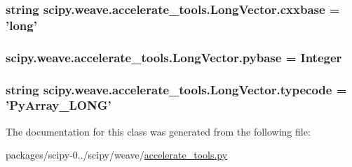 \subsubsection[{cxxbase}]{\setlength{\rightskip}{0pt plus 5cm}string scipy.\+weave.\+accelerate\+\_\+tools.\+Long\+Vector.\+cxxbase = 'long'\hspace{0.3cm}{\ttfamily [static]}}\label{classscipy_1_1weave_1_1accelerate__tools_1_1LongVector_a740fe9568c1789eb15b361f9984df633}
\hypertarget{classscipy_1_1weave_1_1accelerate__tools_1_1LongVector_acdb03a5de2eb9c1ad88e05330e37d3c8}{}
\subsubsection[{pybase}]{\setlength{\rightskip}{0pt plus 5cm}scipy.\+weave.\+accelerate\+\_\+tools.\+Long\+Vector.\+pybase = {\bf Integer}\hspace{0.3cm}{\ttfamily [static]}}\label{classscipy_1_1weave_1_1accelerate__tools_1_1LongVector_acdb03a5de2eb9c1ad88e05330e37d3c8}
\hypertarget{classscipy_1_1weave_1_1accelerate__tools_1_1LongVector_a0508940a8b4ef26b057c7ea077175c50}{}
\subsubsection[{typecode}]{\setlength{\rightskip}{0pt plus 5cm}string scipy.\+weave.\+accelerate\+\_\+tools.\+Long\+Vector.\+typecode = 'Py\+Array\+\_\+\+L\+O\+N\+G'\hspace{0.3cm}{\ttfamily [static]}}\label{classscipy_1_1weave_1_1accelerate__tools_1_1LongVector_a0508940a8b4ef26b057c7ea077175c50}


The documentation for this class was generated from the following file\+:\begin{DoxyCompactItemize}
\item 
packages/scipy-\/0../scipy/weave/\hyperlink{accelerate__tools_8py}{accelerate\+\_\+tools.\+py}\end{DoxyCompactItemize}
